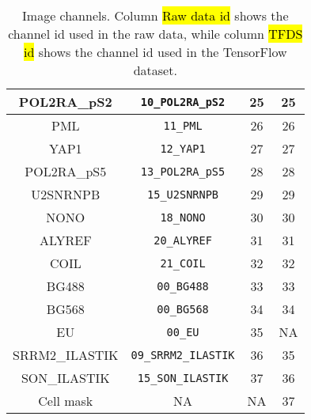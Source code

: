\begin{table}[!ht]
{\begin{tabular}{c|c|c|c}
    \hline
    POL2RA\_pS2 & \texttt{10\_POL2RA\_pS2} & 25 & 25 \\
    \hline
    PML & \texttt{11\_PML} & 26 & 26 \\
    \hline
    YAP1 & \texttt{12\_YAP1} & 27 & 27 \\
    \hline
    POL2RA\_pS5 & \texttt{13\_POL2RA\_pS5} & 28 & 28 \\
    \hline
    U2SNRNPB & \texttt{15\_U2SNRNPB} & 29 & 29 \\
    \hline
    NONO & \texttt{18\_NONO} & 30 & 30 \\
    \hline
    ALYREF & \texttt{20\_ALYREF} & 31 & 31 \\
    \hline
    COIL & \texttt{21\_COIL} & 32 & 32 \\
    \hline
    BG488 & \texttt{00\_BG488} & 33 & 33 \\
    \hline
    BG568 & \texttt{00\_BG568} & 34 & 34 \\
    \hline
    EU & \texttt{00\_EU} & 35 & NA \\
    \hline
    SRRM2\_ILASTIK & \texttt{09\_SRRM2\_ILASTIK} & 36 & 35 \\
    \hline
    SON\_ILASTIK & \texttt{15\_SON\_ILASTIK} & 37 & 36 \\
    \hline
    Cell mask & NA & NA & 37 \\
    \hline
  \end{tabular}%
  }
  \caption{Image channels. Column \hl{Raw data id} shows the channel id used in the raw data, while column \hl{TFDS id} shows the channel id used in the TensorFlow dataset.}
  \label{table:tfds_in:channels}
\end{table}
